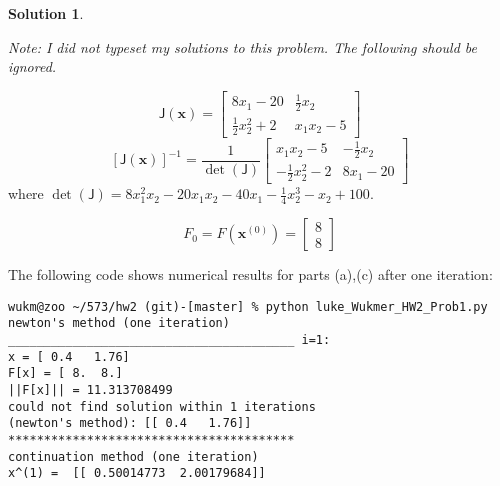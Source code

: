 \documentclass[10pt]{article}
\theoremstyle{plain}
\theoremstyle{definition}
\newtheorem*{soln*}{Solution}
\numberwithin{equation}{section}
\providecommand{\J}{\textsf{J}}
\begin{document}
\begin{soln*}

    \begin{center}
        \textit{Note: I did not typeset my solutions to this problem.
        The following should be ignored.}
        \end{center}
    \[ 
            \J(\bm{x}) = \begin{bmatrix}
                    8x_1 - 20 & \frac{1}{2}x_2 \\
                    \frac{1}{2}x_2^2 + 2 & x_1 x_2 - 5
                        \end{bmatrix}
                    \]
    \[ 
            \left[\J(\bm{x})\right]^{-1} = 
        \frac{1}{\det\left(\J\right)} \begin{bmatrix}
                        x_1 x_2 - 5 & -\frac{1}{2} x_2 \\
                    -\frac{1}{2}x_2^2 - 2 & 8x_1 - 20
                        \end{bmatrix}
    \]
    where $ \det(\J) = 8 x_1^2 x_2 - 20 x_1 x_2 - 40 x_1 - \frac{1}{4}x_2^3 - x_2 + 100 $.

    \[
        F_0 = F(\bm{x}^{(0)}) = \begin{bmatrix} 8 \\ 8 \end{bmatrix}
        \]

The following code shows numerical results for parts (a),(c) after one iteration:

\begin{small} \begin{verbatim}
wukm@zoo ~/573/hw2 (git)-[master] % python luke_Wukmer_HW2_Prob1.py     
newton's method (one iteration)
________________________________________ i=1:
x = [ 0.4   1.76]
F[x] = [ 8.  8.]
||F[x]|| = 11.313708499
could not find solution within 1 iterations
(newton's method): [[ 0.4   1.76]]
****************************************
continuation method (one iteration)
x^(1) =  [[ 0.50014773  2.00179684]]
\end{verbatim}\end{small}
\end{soln*}
\hrulefill
\newpage
\end{document}
